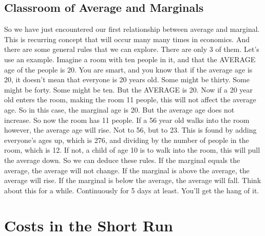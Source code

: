 \subsection{Classroom of Average and Marginals}
So we have just encountered our first relationship between average and marginal. This is recurring concept that will occur many many times in economics. And there are some general rules that we can explore. There are only 3 of them. Let's use an example. Imagine a room with ten people in it, and that the AVERAGE age of the people is 20. You are smart, and you know that if the average age is 20, it doesn't mean that everyone is 20 years old. Some might be thirty. Some might be forty. Some might be ten. But the AVERAGE is 20. Now if a 20 year old enters the room, making the room 11 people, this will not affect the average age. So in this case, the marginal age is 20. But the average age does not increase. So now the room has 11 people. If a 56 year old walks into the room however, the average age will rise. Not to 56, but to 23. This is found by adding everyone's ages up, which is 276, and dividing by the number of people in the room, which is 12. If not, a child of age 10 is to walk into the room, this will pull the average down. So we can deduce these rules. If the marginal equals the average, the average will not change. If the marginal is above the average, the average will rise. If the marginal is below the average, the average will fall. Think about this for a while. Continuously for 5 days at least. You'll get the hang of it.
\section{Costs in the Short Run}
